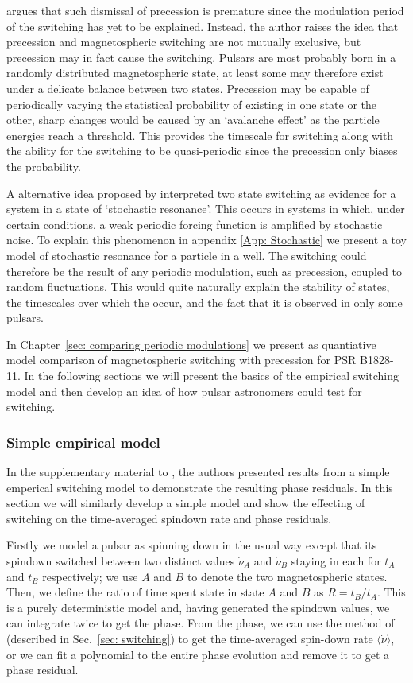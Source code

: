 \citet{Jones2012} argues that such dismissal of precession is premature since
the modulation period of the switching has yet to be explained.  Instead, the
author raises the idea that precession and magnetospheric switching are not
mutually exclusive, but precession may in fact cause the switching. Pulsars are
most probably born in a randomly distributed magnetospheric state, at least
some may therefore exist under a delicate balance between two states.
Precession may be capable of periodically varying the statistical probability
of existing in one state or the other, sharp changes would be caused by an
`avalanche effect' as the particle energies reach a threshold.  This provides
the timescale for switching along with the ability for the switching to be
quasi-periodic since the precession only biases the probability.

A alternative idea proposed by \citet{Cordes2013} interpreted two state
switching as evidence for a system in a state of `stochastic resonance'.  This
occurs in systems in which, under certain conditions, a weak periodic forcing
function is amplified by stochastic noise. To explain this phenomenon in
appendix \ref{App: Stochastic} we present a toy model of stochastic resonance
for a particle in a well. The switching could therefore be the result of any
periodic modulation, such as precession, coupled to random fluctuations. This
would quite naturally explain the stability of states, the timescales over
which the occur, and the fact that it is observed in only some pulsars.

In Chapter~\ref{sec: comparing periodic modulations} we present as quantiative
model comparison of magnetospheric switching with precession for PSR B1828-11.
In the following sections we will present the basics of the empirical switching
model and then develop an idea of how pulsar astronomers could test for switching.

\subsubsection{Simple empirical model}

In the supplementary material to \citet{Lyne2010}, the authors presented
results from a simple emperical switching model to demonstrate the resulting
phase residuals. In this section we will similarly develop a simple model and
show the effecting of switching on the time-averaged spindown rate and phase
residuals.

Firstly we model a pulsar as spinning down in the usual way except that its
spindown switched between two distinct values $\dot{\nu}_{A}$ and $\dot{\nu}_{B}$
staying in each for $t_A$ and $t_B$ respectively; we use
$A$ and $B$ to denote the two magnetospheric states. Then, we
define the ratio of time spent state in state $A$ and $B$ as $R =
t_{B}/t_{A}$.  This is a purely deterministic model and, having generated the
spindown values, we can integrate twice to get the phase. From the phase, we can
use the method of \citet{Lyne2010} (described in Sec.~\ref{sec: switching})
to get the time-averaged spin-down rate $\langle\dot{\nu}\rangle$, or we can
fit a polynomial to the entire phase evolution and remove it to get a phase
residual.

